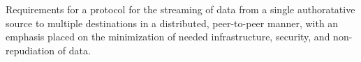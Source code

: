 \documentclass{ubb_dolgozat}
\author{Gardner Márk}
\begin{document}
\begin{abstractEN}
Requirements for a protocol for the streaming of data from a single
authoratative source to multiple destinations in a distributed,
peer-to-peer manner, with an emphasis placed on the minimization of
needed infrastructure, security, and non-repudiation of data.
\end{abstractEN}
\maketitle
\tableofcontents














\end{document}
